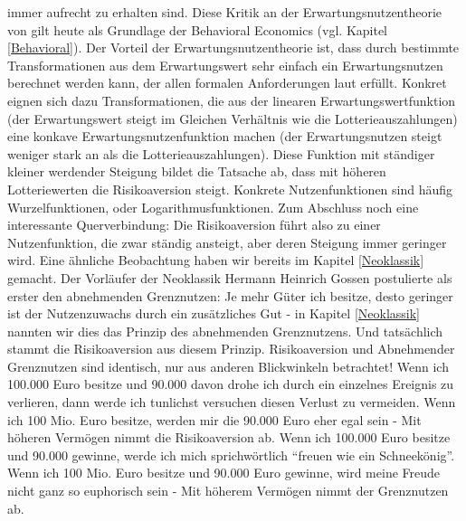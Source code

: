 immer aufrecht zu erhalten sind. Diese Kritik an der Erwartungsnutzentheorie von \textcite{Allais1953} gilt heute als Grundlage der Behavioral Economics (vgl. Kapitel \ref{Behavioral}). Der Vorteil der Erwartungsnutzentheorie ist, dass durch bestimmte Transformationen aus dem Erwartungswert sehr einfach ein Erwartungsnutzen berechnet werden kann, der allen formalen Anforderungen laut \textcite{Morgenstern1944} erfüllt. Konkret eignen sich dazu Transformationen, die aus der linearen Erwartungswertfunktion (der Erwartungswert steigt im Gleichen Verhältnis wie die Lotterieauszahlungen) eine konkave Erwartungsnutzenfunktion machen (der Erwartungsnutzen steigt weniger stark an als die Lotterieauszahlungen). Diese Funktion mit ständiger kleiner werdender Steigung bildet die Tatsache ab, dass mit höheren Lotteriewerten die Risikoaversion steigt. Konkrete Nutzenfunktionen sind häufig Wurzelfunktionen, oder Logarithmusfunktionen. Zum Abschluss noch eine interessante Querverbindung: Die Risikoaversion führt also zu einer Nutzenfunktion, die zwar ständig ansteigt, aber deren Steigung immer geringer wird. Eine ähnliche Beobachtung haben wir bereits im Kapitel \ref{Neoklassik} gemacht. Der Vorläufer der Neoklassik Hermann Heinrich Gossen postulierte als erster den abnehmenden Grenznutzen: Je mehr Güter ich besitze, desto geringer ist der Nutzenzuwachs durch ein zusätzliches Gut - in Kapitel \ref{Neoklassik} nannten wir dies das Prinzip des abnehmenden Grenznutzens. Und tatsächlich stammt die Risikoaversion aus diesem Prinzip. Risikoaversion und Abnehmender Grenznutzen sind identisch, nur aus anderen Blickwinkeln betrachtet! Wenn ich 100.000 Euro besitze und 90.000 davon drohe ich durch ein einzelnes Ereignis zu verlieren, dann werde ich tunlichst versuchen diesen Verlust zu vermeiden. Wenn ich 100 Mio. Euro besitze, werden mir die 90.000 Euro eher egal sein - Mit höheren Vermögen nimmt die Risikoaversion ab. Wenn ich 100.000 Euro besitze und 90.000 gewinne, werde ich mich sprichwörtlich "`freuen wie ein Schneekönig"'. Wenn ich 100 Mio. Euro besitze und 90.000 Euro gewinne, wird meine Freude nicht ganz so euphorisch sein - Mit höherem Vermögen nimmt der Grenznutzen ab.

